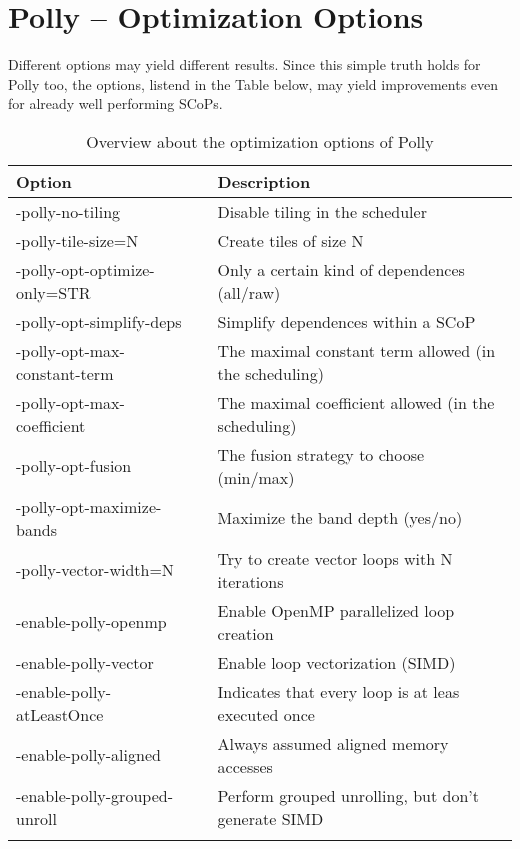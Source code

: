 
\chapter{Polly -- Optimization Options}
\label{AppendixB}

Different options may yield different results. Since this simple truth holds for
Polly too, the options, listend in the Table below, may yield improvements even
for already well performing SCoPs.
\\

\begin{table}[htbp]
  \begin{framed}
  \caption{Overview about the optimization options of Polly}
  \begin{tabularx}{\textwidth}{ l p{1mm} X}
    Option         && Description \\
    \hline
    -polly-no-tiling              && Disable tiling in the scheduler  \\
    -polly-tile-size=N\footnotemark[1] && Create tiles of size N \\
    -polly-opt-optimize-only=STR  && Only a certain kind of dependences (all/raw) \\
    -polly-opt-simplify-deps      && Simplify dependences within a SCoP    \\
    -polly-opt-max-constant-term  && The maximal constant term allowed (in the scheduling) \\
    -polly-opt-max-coefficient    && The maximal coefficient allowed (in the scheduling)  \\
    -polly-opt-fusion             && The fusion strategy to choose (min/max) \\
    -polly-opt-maximize-bands     && Maximize the band depth (yes/no) \\
    -polly-vector-width=N\footnotemark[1]  && Try to create vector loops with N iterations \\
    -enable-polly-openmp          && Enable OpenMP parallelized loop creation \\
    -enable-polly-vector          && Enable loop vectorization (SIMD) \\
    -enable-polly-atLeastOnce     && Indicates that every loop is at leas executed once \\
    -enable-polly-aligned         && Always assumed aligned memory accesses \\
    -enable-polly-grouped-unroll  && Perform grouped unrolling, but don't generate SIMD \\
     &&  \\ 
  \end{tabularx}
  \label{tab:PollyOptions}
  \end{framed}
\end{table}


